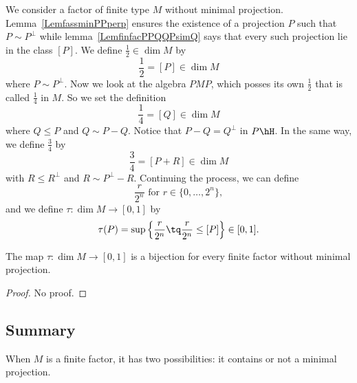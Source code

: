 We consider a factor of finite type $M$ without minimal projection. Lemma~\ref{LemfassminPPperp} ensures the existence of a projection $P$ such that $P\sim P^{\perp}$ while lemma~\ref{LemfinfacPPQQPsimQ} says that every such projection lie in the class $[P]$. We define $\frac{ 1 }{2}\in\dim M$ by
\begin{equation}
\frac{ 1 }{2}=[P]\in\dim M
\end{equation}
where $P\sim P^{\perp}$. Now we look at the algebra $PMP$, which posses its own $\frac{ 1 }{2}$ that is called $\frac{1}{ 4 }$ in $M$. So we set the definition
\begin{equation}
	\frac{1}{ 4 }=[Q]\in\dim M
\end{equation}
where $Q\leq P$ and $Q\sim P-Q$. Notice that $P-Q=Q^{\perp}$ in $P\hH$. In the same way, we define $\frac{ 3 }{ 4 }$ by
\begin{equation}
	\frac{ 3 }{ 4 }=[P+R]\in\dim M
\end{equation}
with $R\leq R^{\perp}$ and $R\sim P^{\perp}-R$. Continuing the process, we can define
\[
	\frac{ r }{ 2^n }\text{ for } r\in\{ 0,\ldots, 2^n \},
\]
and we define $\tau\colon \dim M\to [0,1]$ by
\begin{equation}
	\tau(P)=\sup\Big\{ \frac{ r }{ 2^n }\tq \frac{ r }{ 2^n }\leq [P] \Big\}\in [0,1].
\end{equation}

\begin{theorem}		\label{ThobijzudimM}
The map $\tau\colon \dim M\to [0,1]$ is a bijection for every finite factor without minimal projection.
\end{theorem}

\begin{proof}
No proof.
\end{proof}

					\subsection{Summary}

When $M$ is a finite factor, it has two possibilities: it contains or not a minimal projection.

